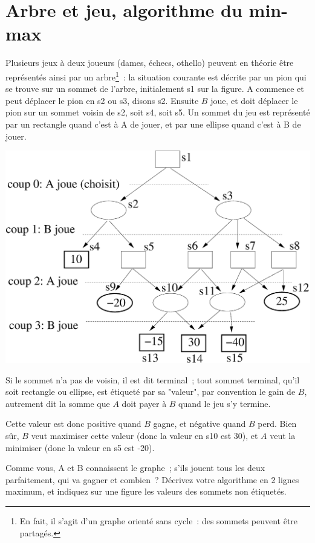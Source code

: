\documentclass[11pt]{article}
\begin{document}
\section{Arbre et jeu, algorithme du min-max}

Plusieurs jeux à deux joueurs  (dames, échecs, othello)
peuvent en théorie  être représentés ainsi par un arbre\footnote{En fait, il s'agit d'un graphe orienté sans cycle~: des sommets peuvent être partagés.}~: 
la situation courante  est décrite par un pion qui se trouve sur un sommet de l'arbre, initialement s1 sur la figure. A commence et peut déplacer le pion en s2 ou s3, disons s2. Ensuite $B$ joue, et doit déplacer le pion sur un sommet voisin de s2, soit s4, soit s5.
Un sommet du jeu est représenté par un rectangle quand c'est à A de jouer,
et par une ellipse quand c'est à B de jouer.

\begin{center}
\includegraphics[width=0.95\linewidth]{jeu.eps}
\end{center}

Si le sommet n'a pas de voisin, il est dit terminal~; 
tout sommet terminal, qu'il soit rectangle ou ellipse,
est étiqueté par sa "valeur", par convention le gain de $B$, autrement dit  
la somme que $A$ doit payer à $B$ quand le jeu s'y termine. 

Cette valeur est donc positive quand $B$ gagne, et négative quand $B$ perd.  
Bien sûr, $B$ veut maximiser cette valeur (donc la valeur en s10 est 30), et $A$ veut 
la minimiser (donc la valeur en s5 est -20). 


Comme vous, A et B connaissent le graphe~; s'ils jouent tous les deux parfaitement, qui va gagner et combien~? Décrivez votre algorithme en 2 lignes maximum, et 
indiquez sur une figure 
les valeurs des sommets non étiquetés.
\end{document}
